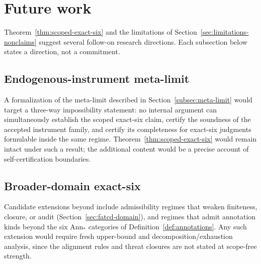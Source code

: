 \section{Future work}\label{sec:future-work}

%
%

Theorem~\ref{thm:scoped-exact-six} and the limitations of
Section~\ref{sec:limitations-nonclaims} suggest several follow-on
research directions. Each subsection below states a direction, not a
commitment.

\subsection{Endogenous-instrument meta-limit}\label{subsec:future-meta-limit}

A formalization of the meta-limit described in
Section~\ref{subsec:meta-limit} would target a three-way
impossibility statement: no internal argument can simultaneously
establish the scoped exact-six claim, certify the soundness of the
accepted instrument family, and certify its completeness for
exact-six judgments formulable inside the same regime.
Theorem~\ref{thm:scoped-exact-six} would remain intact under such a
result; the additional content would be a precise account of
self-certification boundaries.

\subsection{Broader-domain exact-six}\label{subsec:future-broader-domain}

Candidate extensions beyond \FATCD{} include admissibility regimes
that weaken finiteness, closure, or audit
(Section~\ref{sec:fatcd-domain}), and regimes that admit annotation
kinds beyond the six \(\mathrm{Ann}_*\) categories of
Definition~\ref{def:annotations}. Any such extension would require
fresh upper-bound and decomposition/exhaustion analysis, since the
alignment rules and threat closures are not stated at scope-free
strength.

